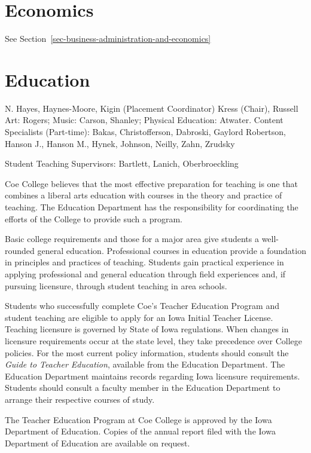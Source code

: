 \documentclass[
  letterpaper,
]{scrbook}
\begin{document}
\section{Economics}\label{sec-economics}

See Section~\ref{sec-business-administration-and-economics}

\section{Education}\label{sec-education}

N. Hayes, Haynes-Moore, Kigin (Placement Coordinator) Kress (Chair),
Russell Art: Rogers; Music: Carson, Shanley; Physical Education:
Atwater. Content Specialists (Part-time): Bakas, Christofferson,
Dabroski, Gaylord Robertson, Hanson J., Hanson M., Hynek, Johnson,
Neilly, Zahn, Zrudsky

Student Teaching Supervisors: Bartlett, Lanich, Oberbroeckling

Coe College believes that the most effective preparation for teaching is
one that combines a liberal arts education with courses in the theory
and practice of teaching. The Education Department has the
responsibility for coordinating the efforts of the College to provide
such a program.

Basic college requirements and those for a major area give students a
well-rounded general education. Professional courses in education
provide a foundation in principles and practices of teaching. Students
gain practical experience in applying professional and general education
through field experiences and, if pursuing licensure, through student
teaching in area schools.

Students who successfully complete Coe's Teacher Education Program and
student teaching are eligible to apply for an Iowa Initial Teacher
License. Teaching licensure is governed by State of Iowa regulations.
When changes in licensure requirements occur at the state level, they
take precedence over College policies. For the most current policy
information, students should consult the \emph{Guide to Teacher
Education}, available from the Education Department. The Education
Department maintains records regarding Iowa licensure requirements.
Students should consult a faculty member in the Education Department to
arrange their respective courses of study.

The Teacher Education Program at Coe College is approved by the Iowa
Department of Education. Copies of the annual report filed with the Iowa
Department of Education are available on request.
\end{document}
